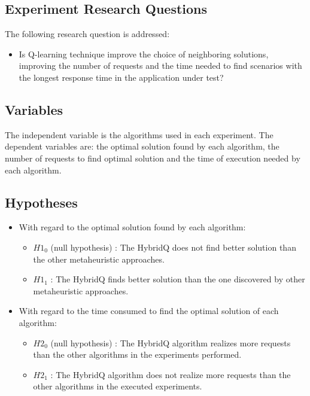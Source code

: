 \documentclass{report}
\begin{document}
\subsection{Experiment Research Questions}

The following research question is addressed:

\begin{itemize}
\item Is Q-learning technique improve the choice of neighboring solutions, improving the number of requests and the time needed to find scenarios with the longest response time in the application under test?
\end{itemize}

\subsection{Variables}

The independent variable is the algorithms used in each experiment. The dependent variables are: the optimal solution found by each algorithm, the number of requests to find optimal solution and the time of execution needed by each algorithm.

\subsection{Hypotheses}

\begin{itemize}
\item With regard to the optimal solution found by each algorithm:
\begin{itemize}
\item $H1_{0}$ (null hypothesis) : The HybridQ does not find better solution than the other metaheuristic approaches.
\item $H1_{1}$  : The HybridQ finds better solution than the one discovered by other metaheuristic approaches.
\end{itemize}
\end{itemize}


\begin{itemize}
\item With regard to the time consumed to find the optimal solution of each algorithm:
\begin{itemize}
\item $H2_{0}$ (null hypothesis) : The HybridQ algorithm realizes more requests than the other algorithms in the experiments performed.
\item $H2_{1}$  : The HybridQ algorithm does not realize more requests than the other algorithms in the executed experiments.
\end{itemize}
\end{itemize}
\end{document}
